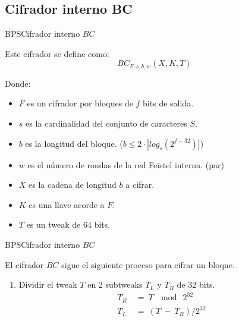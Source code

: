 %
%

\subsection{Cifrador interno BC}

\begin{frame}{BPS}{Cifrador interno $BC$}

  Este cifrador se define como:
    \begin{equation}
      BC_{F,s,b,w}(X,K,T)
    \end{equation}
    
  Donde:
  \begin{itemize}
    \item $F$ es un cifrador por bloques de $f$ bits de salida.
    \item $s$ es la cardinalidad del conjunto de caracteres $S$.
    \item $b$ es la longitud del bloque. ($b \leq 2 \cdot |log_s(2^{f-32})|$)
    \item $w$ es el número de rondas de la red Feistel interna. (par)
    \item $X$ es la cadena de longitud $b$ a cifrar.
    \item $K$ es una llave acorde a $F$.
    \item $T$ es un tweak de 64 bits.
  \end{itemize}
  
\end{frame}

\begin{frame}{BPS}{Cifrador interno $BC$}

  El cifrador $BC$ sigue el siguiente proceso para cifrar un bloque.
  
  \begin{enumerate}  
    \item Dividir el tweak $T$ en 2 subtweaks $T_L$ y $T_R$ de 32 bits.
      \begin{align}
        T_R\: &=\: T\: \mod\: 2^{32}  \\
        T_L\: &=\: (T\: -\: T_R) / 2^{32}
      \end{align}
  \end{enumerate}
  
\end{frame}

